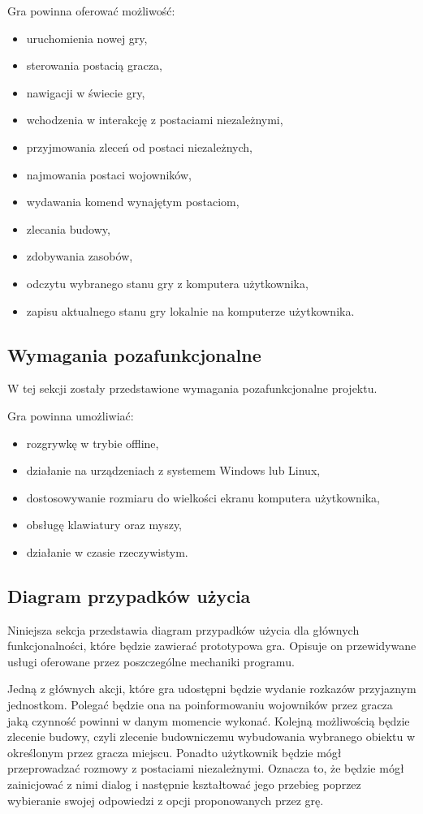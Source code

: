 Gra powinna oferować możliwość:
\begin{itemize}\label{list:fun}
  \item uruchomienia nowej gry,
  \item sterowania postacią gracza,
  \item nawigacji w świecie gry,
  \item wchodzenia w interakcję z postaciami niezależnymi,
  \item przyjmowania zleceń od postaci niezależnych,
  \item najmowania postaci wojowników,
  \item wydawania komend wynajętym postaciom,
  \item zlecania budowy,
  \item zdobywania zasobów,
  \item odczytu wybranego stanu gry z komputera użytkownika,
  \item zapisu aktualnego stanu gry lokalnie na komputerze użytkownika.
\end{itemize}

\subsection{Wymagania pozafunkcjonalne}\label{ss:nonfun}
W tej sekcji zostały przedstawione wymagania pozafunkcjonalne projektu.

Gra powinna umożliwiać:
\begin{itemize}\label{list:nonfun}
  \item rozgrywkę w trybie offline,
  \item działanie na urządzeniach z systemem Windows lub Linux,
  \item dostosowywanie rozmiaru do wielkości ekranu komputera użytkownika,
  \item obsługę klawiatury oraz myszy,
  \item działanie w czasie rzeczywistym.
\end{itemize}

\subsection{Diagram przypadków użycia}\label{ss:usecase}
Niniejsza sekcja przedstawia diagram przypadków użycia dla głównych funkcjonalności, które będzie zawierać prototypowa gra.
Opisuje on przewidywane usługi oferowane przez poszczególne mechaniki programu.

Jedną z głównych akcji, które gra udostępni będzie wydanie rozkazów przyjaznym jednostkom. Polegać będzie ona na poinformowaniu
wojowników przez gracza jaką czynność powinni w danym momencie wykonać. Kolejną możliwością będzie zlecenie budowy, czyli
zlecenie budowniczemu wybudowania wybranego obiektu w określonym przez gracza miejscu. Ponadto użytkownik
będzie mógł przeprowadzać rozmowy z postaciami niezależnymi. Oznacza to, że będzie mógł zainicjować z nimi dialog i
następnie kształtować jego przebieg poprzez wybieranie swojej odpowiedzi z opcji proponowanych przez grę.

